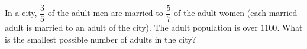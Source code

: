 In a city, $\dfrac{3}{5}$ of the adult men are married to $\dfrac{5}{7}$ of the adult women (each married adult is married to an adult of the city). The adult population is over $1100$. What is the smallest possible number of adults in the city?
